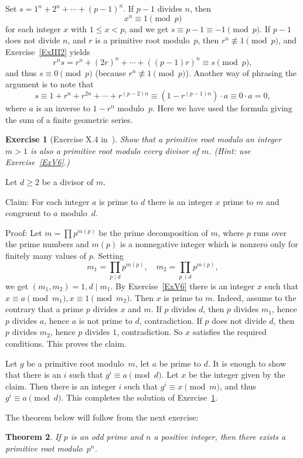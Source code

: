 \documentclass[12pt,letterpaper]{article}
\newtheorem{thm}{Theorem}%
\newtheorem{exer}[thm]{Exercise}
\theoremstyle{definition}
\begin{document}
Set $s = 1^n+2^n+\cdots+(p-1)^n$. If $p-1$ divides $n$, then 
$$
x^n \equiv 1 \pmod{p}
$$ 
for each integer $x$ with $1\le x<p$, and we get $s \equiv p-1 \equiv -1 \pmod{p}$. If $p-1$ does not divide $n$, and $r$ is a primitive root modulo~$p$, then $r^n \not\equiv 1\pmod{p}$, and Exercise~\ref{ExIII2} yields 
$$
r^ns=r^n+(2r)^n+\cdots+((p-1)r)^n\equiv s\pmod{p},
$$ 
and thus $s\equiv0\pmod{p}$ (because $r^n\not\equiv1\pmod{p}$). Another way of phrasing the argument is to note that 
$$
s \equiv 1+r^n+r^{2n}+\cdots+r^{(p-2)n}\equiv (1-r^{(p-1)n})\cdot a \equiv 0\cdot a = 0,
$$ 
where $a$ is an inverse to $1-r^n$ modulo~$p$. Here we have used the formula giving the sum of a finite geometric series. 

\begin{exer}[Exercise X.4 in~\cite{weil1979}]\label{ExX4}
Show that a primitive root modulo an integer $m>1$ is also a primitive root modulo every divisor of $m$. (Hint: use Exercise~\ref{ExV6}.) 
\end{exer}

Let $d\ge2$ be a divisor of $m$. 

Claim: For each integer $a$ is prime to $d$ there is an integer $x$ prime to $m$ and congruent to $a$ modulo~$d$. 

Proof: Let $m=\prod p^{m(p)}$ be the prime decomposition of $m$, where $p$ runs over the prime numbers and $m(p)$ is a nonnegative integer which is nonzero only for finitely many values of $p$. Setting 
$$
m_1=\prod_{p\mid d} p^{m(p)},\quad m_2=\prod_{p\,\nmid d} p^{m(p)},
$$ 
we get $(m_1,m_2)=1, d\mid m_1$. By Exercise~\ref{ExV6} there is an integer $x$ such that $x\equiv a\pmod{m_1}, x\equiv 1\pmod{m_2}$. Then $x$ is prime to $m$. Indeed, assume to the contrary that a prime $p$ divides $x$ and $m$. If $p$ divides $d$, then $p$ divides $m_1$, hence $p$ divides $a$, hence $a$ is not prime to $d$, contradiction. If $p$ does not divide $d$, then $p$ divides $m_2$, hence $p$ divides $1$, contradiction. So $x$ satisfies the required conditions. This proves the claim. 

Let $g$ be a primitive root modulo~$m$, let $a$ be prime to $d$. It is enough to show that there is an $i$ such that $g^i\equiv a\pmod{d}$. Let $x$ be the integer given by the claim. Then there is an integer $i$ such that $g^i\equiv x\pmod{m}$, and thus $g^i\equiv a\pmod{d}$. This completes the solution of Exercise~\ref{ExX4}. 

The theorem below will follow from the next exercise: 

\begin{thm}\label{Tpn}
If $p$ is an odd prime and $n$ a positive integer, then there exists a primitive root modulo~$p^n$. 
\end{thm}
\end{document}
